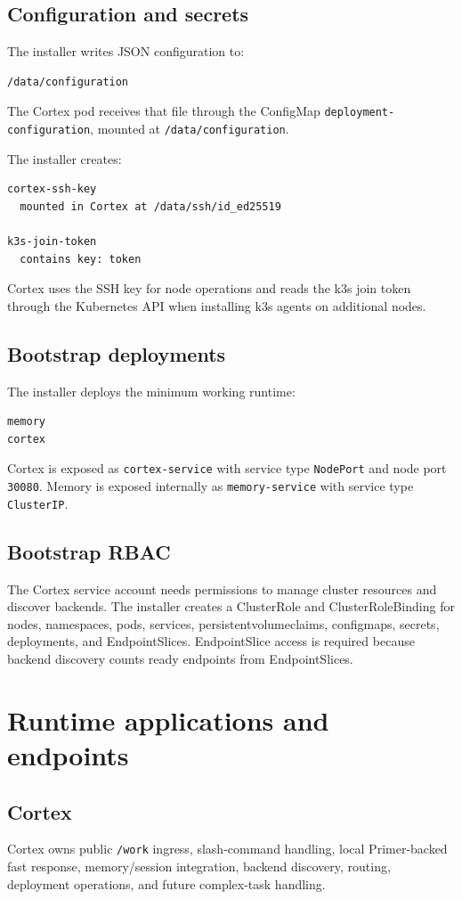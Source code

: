 \documentclass[11pt,a4paper]{article}
\begin{document}
\subsection{Configuration and secrets}
The installer writes JSON configuration to:
\begin{lstlisting}
/data/configuration
\end{lstlisting}

The Cortex pod receives that file through the ConfigMap \texttt{deployment-configuration}, mounted at \texttt{/data/configuration}.

The installer creates:
\begin{lstlisting}
cortex-ssh-key
  mounted in Cortex at /data/ssh/id_ed25519

k3s-join-token
  contains key: token
\end{lstlisting}

Cortex uses the SSH key for node operations and reads the k3s join token through the Kubernetes API when installing k3s agents on additional nodes.

\subsection{Bootstrap deployments}
The installer deploys the minimum working runtime:
\begin{lstlisting}
memory
cortex
\end{lstlisting}

Cortex is exposed as \texttt{cortex-service} with service type \texttt{NodePort} and node port \texttt{30080}. Memory is exposed internally as \texttt{memory-service} with service type \texttt{ClusterIP}.

\subsection{Bootstrap RBAC}
The Cortex service account needs permissions to manage cluster resources and discover backends. The installer creates a ClusterRole and ClusterRoleBinding for nodes, namespaces, pods, services, persistentvolumeclaims, configmaps, secrets, deployments, and EndpointSlices. EndpointSlice access is required because backend discovery counts ready endpoints from EndpointSlices.

\section{Runtime applications and endpoints}
\subsection{Cortex}
Cortex owns public \texttt{/work} ingress, slash-command handling, local Primer-backed fast response, memory/session integration, backend discovery, routing, deployment operations, and future complex-task handling.
\end{document}
